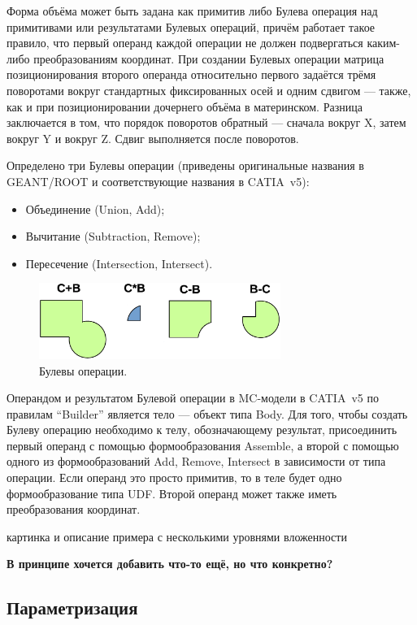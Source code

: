 Форма объёма может быть задана как примитив либо Булева операция над примитивами или результатами Булевых операций, причём работает такое правило, что первый операнд каждой операции не должен подвергаться каким-либо преобразованиям координат. При создании Булевых операции матрица позиционирования второго операнда относительно первого задаётся трёмя поворотами вокруг стандартных фиксированных осей и одним сдвигом --- также, как и при позиционировании дочернего объёма в материнском. Разница заключается в том, что порядок поворотов обратный --- сначала вокруг X, затем вокруг Y и вокруг Z. Сдвиг выполняется после поворотов.

Определено три Булевы операции (приведены оригинальные названия в GEANT/ROOT и соответствующие названия в CATIA~v5):

\begin{itemize}
\item{Объединение (Union, Add);}
\item{Вычитание (Subtraction, Remove);}
\item{Пересечение (Intersection, Intersect).}
\end{itemize}

\begin{figure}[H]
\centering
\includegraphics[width=0.7\textwidth]{pictures/Boolean.eps}
\caption{Булевы операции.}
\label{fig:Boolean}
\end{figure}

Операндом и результатом Булевой операции в MC-модели в CATIA~v5 по правилам ``Builder'' является тело --- объект типа Body. Для того, чтобы создать Булеву операцию необходимо к телу, обозначающему результат, присоединить первый операнд с помощью формообразования Assemble, а второй с помощью одного из формообразований Add, Remove, Intersect в зависимости от типа операции. Если операнд это просто примитив, то в теле будет одно формообразование типа UDF. Второй операнд может также иметь преобразования координат.

\todo картинка и описание примера с несколькими уровнями вложенности

\todo \textbf{В принципе хочется добавить что-то ещё, но что конкретно?}

\subsection{Параметризация}\label{sec:Parameterization}

